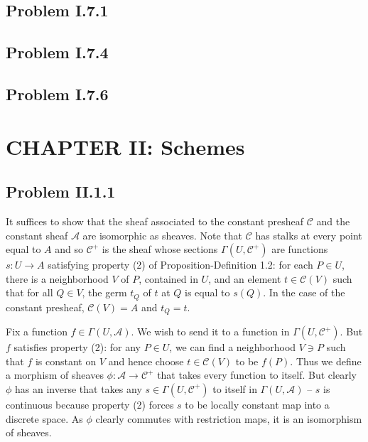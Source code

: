 \documentclass{mathnotes}
\begin{document}
\subsection*{Problem I.7.1}

\subsection*{Problem I.7.4}

\subsection*{Problem I.7.6}

\newpage
\section*{CHAPTER II: Schemes}


\subsection*{Problem II.1.1}
It suffices to show that the sheaf associated to the constant presheaf $\mathcal{C}$ and the constant sheaf $\mathcal{A}$
are isomorphic as sheaves. Note that $\mathcal{C}$ has stalks at every point equal to $A$ and so $\mathcal{C}^+$ is the sheaf
whose sections $\Gamma(U,\mathcal{C}^+)$ are functions $s:U\to A$ satisfying property (2) of Proposition-Definition 1.2:
for each $P\in U$, there is a neighborhood $V$ of $P$, contained in $U$, and an element $t\in\mathcal{C}(V)$ such that for
all $Q\in V$, the germ $t_Q$ of $t$ at $Q$ is equal to $s(Q)$. In the case of the constant presheaf, $\mathcal{C}(V)=A$ and
$t_Q=t$.

Fix a function $f\in\Gamma(U,\mathcal{A})$. We wish to send it to a function in $\Gamma(U,\mathcal{C}^+)$. But $f$ satisfies
property (2): for any $P\in U$, we can find a neighborhood $V\ni P$ such that $f$ is constant on $V$ and hence choose
$t\in\mathcal{C}(V)$ to be $f(P)$. Thus we define a morphism of sheaves $\phi:\mathcal{A}\to\mathcal{C}^+$ that takes every
function to itself. But clearly $\phi$ has an inverse that takes any $s\in\Gamma(U,\mathcal{C}^+)$ to itself in
$\Gamma(U,\mathcal{A})$ -- $s$ is continuous because property (2) forces $s$ to be locally constant map into a discrete
space. As $\phi$ clearly commutes with restriction maps, it is an isomorphism of sheaves.
\end{document}
